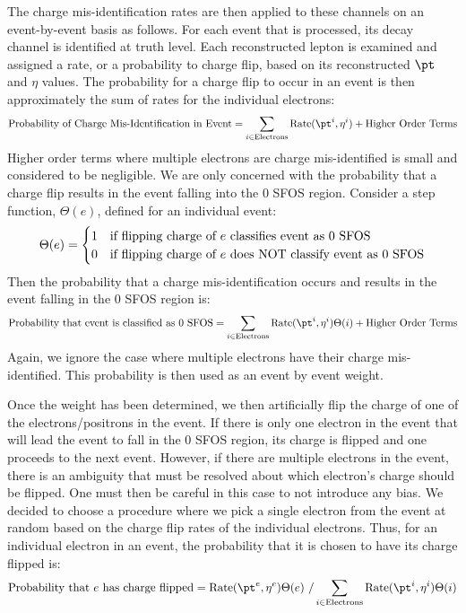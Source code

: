 The charge mis-identification rates are then applied to these channels on an event-by-event basis as follows.
For each event that is processed, its decay channel is identified at truth level. Each reconstructed lepton
is examined  and assigned a rate, or a probability to charge flip, based on its reconstructed $\pt$ and $\eta$ values.
The probability for a charge flip to occur in an event is then approximately the sum of rates for the individual electrons:
\begin{equation}
\textrm{Probability of Charge Mis-Identification in Event} = \sum_{i \in \textrm{Electrons}}  \textrm{Rate}(\pt^i,\eta^i) + \textrm{Higher Order Terms}
\end{equation}
Higher order terms where multiple electrons are charge mis-identified is small and considered to be negligible.
We are only concerned with the probability that a charge flip results in the event falling into the 0 SFOS region. 
Consider a step function, $\Theta(e)$, defined for an individual event:
\[
\Theta(e) = 
\begin{cases}
\hfill 1 \hfill & \text{if flipping charge of $e$ classifies event as 0 SFOS} \\
\hfill 0 \hfill & \text{if flipping charge of $e$ does NOT classify event as 0 SFOS}\\
\end{cases}
\]
Then the probability that a charge mis-identification occurs and results in the event falling in the 0 SFOS region is:
\begin{equation}
\textrm{Probability that event is classified as 0 SFOS} = \sum_{i \in \textrm{Electrons}}  \textrm{Rate}(\pt^i,\eta^i)\Theta(i) + \textrm{Higher Order Terms}
\end{equation}
Again, we ignore the case where multiple electrons have their charge mis-identified.  
This probability is then used as an event by event weight. 



Once the weight has been determined, we then artificially flip the charge of one of the electrons/positrons in the event.
If there is only one electron in the event that will lead the event to fall in the 0 SFOS region, its charge is flipped
and one proceeds to the next event.  However, if there are multiple electrons in the event, there is an ambiguity that must be resolved
about which electron's charge should be flipped. One must then be careful in this case to not introduce any bias.
We decided to choose a procedure where we pick a single electron from the event at random based on the charge flip rates
of the individual electrons. Thus, for an individual electron in an event, the probability that it is chosen to have its charge
flipped is:
\begin{equation}
\textrm{Probability that $e$ has charge flipped} = \textrm{Rate}(\pt^e,\eta^e)\Theta(e)~/\sum_{i \in \textrm{Electrons}} \textrm{Rate}(\pt^i,\eta^i)\Theta(i)
\end{equation}

